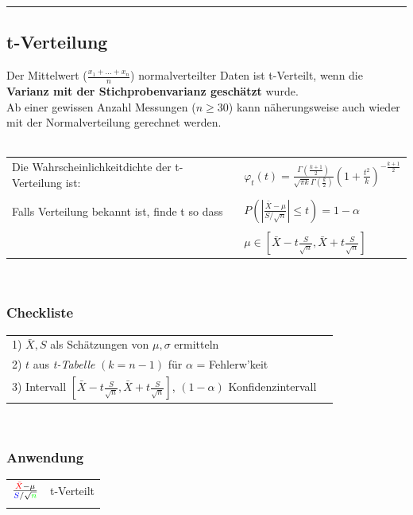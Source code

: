 \hrule

	\subsection{t-Verteilung }
	Der Mittelwert ($\frac{x_1+\ldots+x_n}{n}$) normalverteilter Daten ist
    t-Verteilt, wenn die \textbf{Varianz mit der Stichprobenvarianz geschätzt} wurde.\\
    Ab einer gewissen Anzahl Messungen ($n \geq 30$) kann näherungsweise auch wieder mit
    der Normalverteilung gerechnet werden.  \\ \\
	\begin{tabular}{p{10cm}p{8cm}}
    Die Wahrscheinlichkeitdichte der
    t-Verteilung ist: &$\varphi_t(t)=\frac{\Gamma (\frac{k+1}{2})}{\sqrt{\pi
    k}\Gamma(\frac{k}{2})}\left(1+\frac{t^2}{k}\right)^{- \frac{k+1}{2}}$\\ \\
    Falls Verteilung bekannt ist, finde t so dass
    &$P\left(\left|\frac{\bar{X}-\mu}{S / \sqrt{n}}\right|\leq t\right) = 1 - \alpha$\\ \\
    &$\mu\in\left[\bar{X}-t\frac{S}{\sqrt{n}},\bar{X}+t\frac{S}{\sqrt{n}}\right]$\\
    \end{tabular}\\
	\begin{minipage}{10cm}
 		\subsubsection{Checkliste}
		\begin{tabular}{ll}
        1) $\bar{X}, S$ als Schätzungen von $\mu, \sigma$ ermitteln\\
        2) $t$ aus {\em t-Tabelle} $(k=n-1)$ für $\alpha$ = Fehlerw'keit\\
        3) Intervall
        $\left[\bar{X}-t\frac{S}{\sqrt{n}},\bar{X}+t\frac{S}{\sqrt{n}}\right]$,
        $(1-\alpha)$ Konfidenzintervall
        \end{tabular}\\
		\subsubsection{Anwendung}
		\begin{tabular}{ll}
        $\frac{\textcolor{red}{\bar{X}}-\mu}{\textcolor{blue}{S}/\sqrt{\textcolor{green}{n}}}$
        & t-Verteilt\\ \\
        \end{tabular}
    
    \end{minipage}
